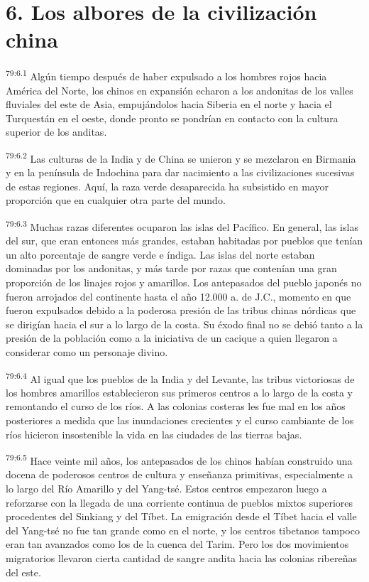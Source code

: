 \section*{6. Los albores de la civilización china}
\par
\textsuperscript{79:6.1} Algún tiempo después de haber expulsado a los hombres rojos hacia América del Norte, los chinos en expansión echaron a los andonitas de los valles fluviales del este de Asia, empujándolos hacia Siberia en el norte y hacia el Turquestán en el oeste, donde pronto se pondrían en contacto con la cultura superior de los anditas.

\par
\textsuperscript{79:6.2} Las culturas de la India y de China se unieron y se mezclaron en Birmania y en la península de Indochina para dar nacimiento a las civilizaciones sucesivas de estas regiones. Aquí, la raza verde desaparecida ha subsistido en mayor proporción que en cualquier otra parte del mundo.

\par
\textsuperscript{79:6.3} Muchas razas diferentes ocuparon las islas del Pacífico. En general, las islas del sur, que eran entonces más grandes, estaban habitadas por pueblos que tenían un alto porcentaje de sangre verde e índiga. Las islas del norte estaban dominadas por los andonitas, y más tarde por razas que contenían una gran proporción de los linajes rojos y amarillos. Los antepasados del pueblo japonés no fueron arrojados del continente hasta el año 12.000 a. de J.C., momento en que fueron expulsados debido a la poderosa presión de las tribus chinas nórdicas que se dirigían hacia el sur a lo largo de la costa. Su éxodo final no se debió tanto a la presión de la población como a la iniciativa de un cacique a quien llegaron a considerar como un personaje divino.

\par
\textsuperscript{79:6.4} Al igual que los pueblos de la India y del Levante, las tribus victoriosas de los hombres amarillos establecieron sus primeros centros a lo largo de la costa y remontando el curso de los ríos. A las colonias costeras les fue mal en los años posteriores a medida que las inundaciones crecientes y el curso cambiante de los ríos hicieron insostenible la vida en las ciudades de las tierras bajas.

\par
\textsuperscript{79:6.5} Hace veinte mil años, los antepasados de los chinos habían construido una docena de poderosos centros de cultura y enseñanza primitivas, especialmente a lo largo del Río Amarillo y del Yang-tsé. Estos centros empezaron luego a reforzarse con la llegada de una corriente continua de pueblos mixtos superiores procedentes del Sinkiang y del Tíbet. La emigración desde el Tíbet hacia el valle del Yang-tsé no fue tan grande como en el norte, y los centros tibetanos tampoco eran tan avanzados como los de la cuenca del Tarim. Pero los dos movimientos migratorios llevaron cierta cantidad de sangre andita hacia las colonias ribereñas del este.

